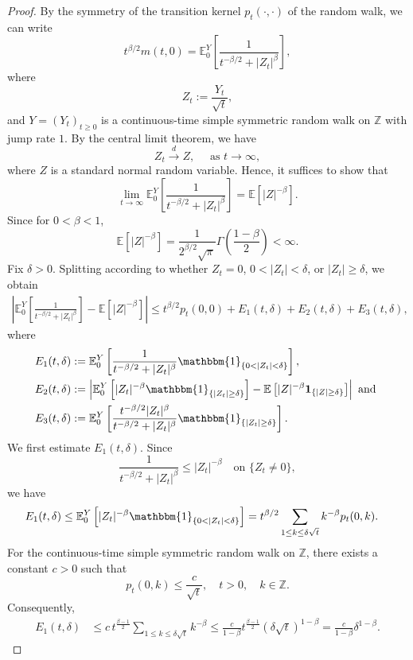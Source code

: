 \documentclass{article}[12pt]
\theoremstyle{definition}
\newcommand{\1}{\mathbbm{1}}
\begin{document}
\begin{proof}
By the symmetry of the transition kernel $p_t(\cdot,\cdot)$ of the random walk, we can write
$$t^{\beta/2}m(t,0)=
\mathbb{E}_0^Y\left[\frac{1}{t^{-\beta/2}+|Z_t|^\beta}\right],
$$
where
$$
Z_t:=\frac{Y_t}{\sqrt{t}},
$$
and $Y=(Y_t)_{t\geq 0}$ is a continuous-time simple symmetric random walk on $\mathbb{Z}$ with jump rate $1$. By the central limit theorem, we have
$$
Z_t\xrightarrow{d} Z, \quad \text{ as } t\to\infty,
$$
where $Z$ is a standard normal random variable. Hence, it suffices to show that
\begin{equation}
\lim_{t\to\infty}
\mathbb{E}_0^Y
\left[
\frac{1}{t^{-\beta/2}+|Z_t|^\beta}
\right]
=
\mathbb{E}\left[|Z|^{-\beta}\right].
\label{eqn:singular-limit}
\end{equation}
Since for $0<\beta<1$,
\[
\mathbb{E}\left[|Z|^{-\beta}\right]
=
\frac{1}{2^{\beta/2}\sqrt{\pi}}
\Gamma\left(\frac{1-\beta}{2}\right)
<\infty.
\]
Fix $\delta>0$. Splitting according to whether $Z_t=0$, $0<|Z_t|<\delta$, or $|Z_t|\geq\delta$, we obtain
\begin{align*}
\left|
\mathbb{E}_0^Y
\left[
\frac{1}{t^{-\beta/2}+|Z_t|^\beta}
\right]
-
\mathbb{E}\left[|Z|^{-\beta}\right]
\right|
\leq
t^{\beta/2}p_t(0,0)
+
E_1(t,\delta)
+
E_2(t,\delta)
+
E_3(t,\delta),
\end{align*}
where
\begin{align*}
E_1(t,\delta)&:=\mathbb{E}_0^Y\left[\frac{1}{t^{-\beta/2}+|Z_t|^\beta}\1_{\{0<|Z_t|<\delta\}}\right],\\
E_2(t,\delta) &:=\left|\mathbb{E}_0^Y\left[|Z_t|^{-\beta}\1_{\{|Z_t|\geq\delta\}}\right]
-\mathbb{E}\left[|Z|^{-\beta}\mathbf{1}_{\{|Z|\geq\delta\}}\right]\right| \text{ and }\\
E_3(t,\delta)&:=\mathbb{E}_0^Y\left[\frac{t^{-\beta/2}|Z_t|^\beta}{t^{-\beta/2}+|Z_t|^\beta}\1_{\{|Z_t|\geq\delta\}}\right].
\end{align*}
We first estimate $E_1(t,\delta)$. Since
$$
\frac{1}{t^{-\beta/2}+|Z_t|^\beta}\leq |Z_t|^{-\beta}\quad\text{on }\{Z_t\neq0\},
$$
we have
\begin{align*}
E_1(t,\delta)&\leq \mathbb{E}_0^Y\left[|Z_t|^{-\beta}\1_{\{0<|Z_t|<\delta\}}\right]=t^{\beta/2}\sum_{1\leq k\leq\delta\sqrt{t}}k^{-\beta}p_t(0,k).
\end{align*}
For the continuous-time simple symmetric random walk on $\mathbb{Z}$, there exists a constant $c>0$ such that
$$
p_t(0,k)\leq \frac{c}{\sqrt{t}},\quad t>0,\quad k\in\mathbb{Z}.
$$
Consequently,
\begin{align*}
E_1(t,\delta)&\leq c\,t^{\frac{\beta-1}{2}}\sum_{1\leq k\leq\delta\sqrt{t}}k^{-\beta}\leq\frac{c}{1-\beta} t^{\frac{\beta-1}{2}}(\delta\sqrt{t})^{1-\beta}=\frac{c}{1-\beta}\delta^{1-\beta}.

\end{align*}
\end{proof}
\end{document}
